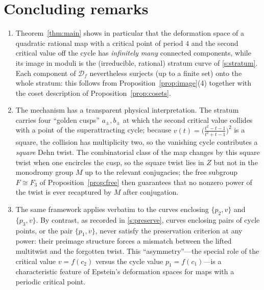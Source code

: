 \documentclass[11pt]{amsart}
\theoremstyle{plain}
\theoremstyle{definition}
\newcommand{\D}{\mathcal{D}}
\newcommand{\S}{\mathcal{S}}
\begin{document}
\section{Concluding remarks}

\begin{enumerate}
\item Theorem~\ref{thm:main} shows in particular that the deformation space
of a quadratic rational map with a critical point of period $4$ and the
second critical value off the cycle has \emph{infinitely many} connected
components, while its image in moduli is the (irreducible, rational)
stratum curve of \S\ref{s:stratum}.  Each component of $\D_f$ nevertheless
surjects (up to a finite set) onto the whole stratum: this follows from
Proposition~\ref{prop:image}(4) together with the coset description of
Proposition~\ref{prop:cosets}.
\item The mechanism has a transparent physical interpretation.  The stratum
carries four ``golden cusps'' $a_\pm,b_\pm$ at which the second critical
value collides with a point of the superattracting cycle; because
$v(t)=\bigl(\frac{t^2-t-1}{t^2+t-1}\bigr)^2$ is a square, the collision
has multiplicity two, so the vanishing cycle contributes a
\emph{square} Dehn twist.  The combinatorial class of the map changes by
this square twist when one encircles the cusp, so the square twist lies in
$Z$ but not in the monodromy group $M$ up to the relevant conjugacies; the
free subgroup $F\cong F_3$ of Proposition~\ref{prop:free} then guarantees
that no nonzero power of the twist is ever recaptured by $M$ after
conjugation.
\item The same framework applies verbatim to the curves enclosing
$\{p_2,v\}$ and $\{p_3,v\}$.  By contrast, as recorded in
\S\ref{s:preserve}, curves enclosing pairs of cycle points, or the pair
$\{p_1,v\}$, never satisfy the preservation criterion at any power: their
preimage structure forces a mismatch between the lifted multitwist and the
forgotten twist.  This ``asymmetry''---the special role of the critical
value $v=f(c_2)$ versus the cycle value $p_1=f(c_1)$---is a characteristic
feature of Epstein's deformation spaces for maps with a periodic critical
point.
\end{enumerate}
\end{document}

